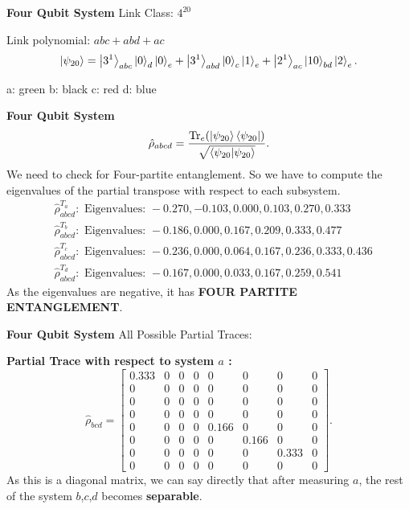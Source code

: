 \documentclass[usenames,dvipsnames]{beamer}
\begin{document}
	\begin{frame}{\textbf{Four Qubit System}}
		Link Class: $4^{20}$
		
		Link polynomial: $abc+ abd + ac$
		\begin{equation*}
			\ket{\psi_{20}} = \ket{3^1}_{abc}\ket{0}_{d} \ket{0}_e + \ket{3^1}_{abd} \ket{0}_c \ket{1}_e + \ket{2^1}_{ac} \ket{10}_{bd} \ket{2}_e.
		\end{equation*}
		\begin{figure}
			\centering
			\scalebox{0.5}{}
		\end{figure}
		a: green    b: black   c: red   d: blue   
		\end{frame}
		
		\begin{frame}{\textbf{Four Qubit System}}
		\begin{equation*}
			\hat{\rho}_{abcd} = \frac{\Tr_e(\ket{\psi_{20}} \bra{\psi_{20}})}{\sqrt{\bra{\psi_{20}} \ket{\psi_{20}}}}.
		\end{equation*}
		We need to check for Four-partite entanglement. So we have to compute the eigenvalues of the partial transpose with respect to each subsystem.
		\begin{equation*}
		\begin{split}
			&\hat{\rho}^{T_a}_{abcd} : \text{ Eigenvalues: } -0.270, -0.103, 0.000, 0.103, 0.270, 0.333 \\
			&\hat{\rho}^{T_b}_{abcd}: \text{ Eigenvalues: } -0.186, 0.000, 0.167, 0.209, 0.333, 0.477 \\
			&\hat{\rho}^{T_c}_{abcd}: \text{ Eigenvalues: } -0.236, 0.000, 0.064, 0.167, 0.236, 0.333, 0.436 \\
			&\hat{\rho}^{T_d}_{abcd}: \text{ Eigenvalues: } -0.167, 0.000, 0.033, 0.167, 0.259, 0.541
		\end{split}
		\end{equation*}
		\onslide<2->
		{As the eigenvalues are negative, it has \textbf{FOUR PARTITE ENTANGLEMENT}.}
		\end{frame}
		
		\begin{frame}{\textbf{Four Qubit System}}
		All Possible Partial Traces:
		
		\textbf{Partial Trace with respect to system $a$ :}
		\begin{equation*}
			\hat{\rho}_{bcd} = \left[\begin{matrix}0.333 & 0 & 0 & 0 & 0 & 0 & 0 & 0\\0 & 0 & 0 & 0 & 0 & 0 & 0 & 0\\0 & 0 & 0 & 0 & 0 & 0 & 0 & 0\\0 & 0 & 0 & 0 & 0 & 0 & 0 & 0\\0 & 0 & 0 & 0 & 0.166 & 0 & 0 & 0\\0 & 0 & 0 & 0 & 0 & 0.166 & 0 & 0\\0 & 0 & 0 & 0 & 0 & 0 & 0.333 & 0\\0 & 0 & 0 & 0 & 0 & 0 & 0 & 0\end{matrix}\right].
		\end{equation*}
		As this is a diagonal matrix, we can say directly that after measuring $a$, the rest of the system $b$,$c$,$d$ becomes \textbf{separable}.
		\end{frame}
		
\end{document}
